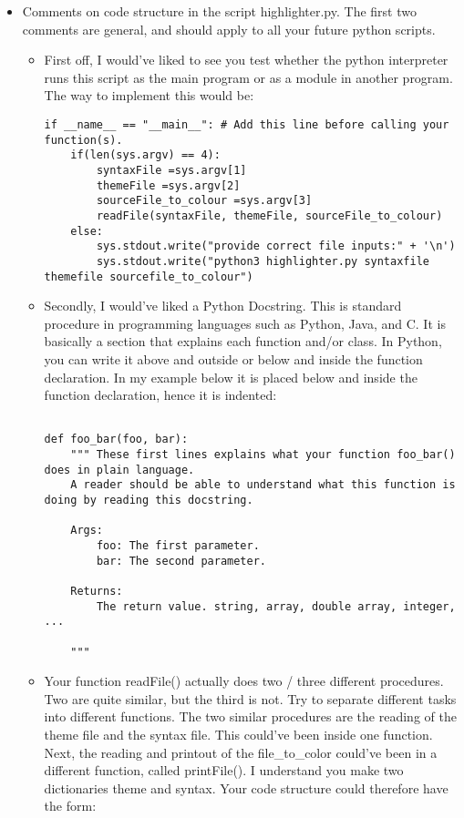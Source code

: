 \documentclass[a4paper]{article}
\begin{document}
\begin{itemize}
  \item Comments on code structure in the script highlighter.py. The first two comments are general, and should apply to all your future python scripts.
\begin{itemize}
	\item First off, I would've liked to see you test whether the python interpreter runs this script as the main program or as a module in another program. The way to implement this would be: 
    
    \begin{verbatim}
if __name__ == "__main__": # Add this line before calling your function(s).
	if(len(sys.argv) == 4):	
		syntaxFile =sys.argv[1]
		themeFile =sys.argv[2]
		sourceFile_to_colour =sys.argv[3]
		readFile(syntaxFile, themeFile, sourceFile_to_colour)	
	else:
		sys.stdout.write("provide correct file inputs:" + '\n')
		sys.stdout.write("python3 highlighter.py syntaxfile themefile sourcefile_to_colour")
	\end{verbatim}
\newline
	\item Secondly, I would've liked a Python Docstring. This is standard procedure in programming languages such as Python, Java, and C. It is basically a section that explains each function and/or class. In Python, you can write it above and outside or below and inside the function declaration. In my example below it is placed below and inside the function declaration, hence it is indented:
    
    \begin{verbatim}

def foo_bar(foo, bar):
    """ These first lines explains what your function foo_bar() does in plain language.
    A reader should be able to understand what this function is doing by reading this docstring.

    Args:
        foo: The first parameter.
        bar: The second parameter.

    Returns:
        The return value. string, array, double array, integer, ...

    """
	\end{verbatim}
\newline
	\item Your function readFile() actually does two / three different procedures. Two are quite similar, but the third is not. Try to separate different tasks into different functions.
    The two similar procedures are the reading of the theme file and the syntax file. This could've been inside one function. 
    Next, the reading and printout of the file\_to\_color could've been in a different function, called printFile().
    I understand you make two dictionaries theme and syntax. Your code structure could therefore have  the form:
    

\end{itemize}
\end{itemize}
\end{document}
